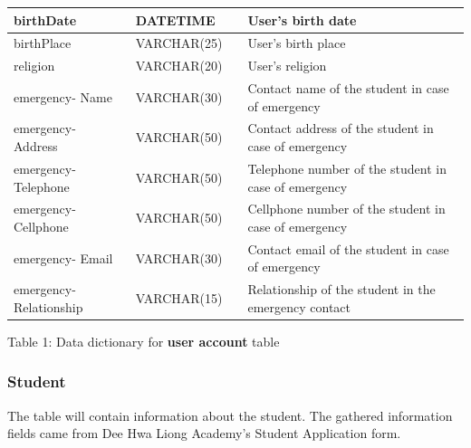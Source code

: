 \documentclass[11pt,a4paper,titlepage]{article}
\begin{document}
\begin{longtable}{ |p{2.5cm}|p{4.5cm}|p{2.5cm}|p{3cm}|  }
    birthDate & DATETIME & & User's birth date \\ \hline
    birthPlace & VARCHAR(25) & & User's birth place \\ \hline
    religion & VARCHAR(20) & & User's religion \\ \hline
    emergency- Name & VARCHAR(30) & & Contact name of the student in case of emergency \\ \hline
    emergency- Address & VARCHAR(50) & & Contact address of the student in case of emergency \\ \hline
    emergency- Telephone & VARCHAR(50) & & Telephone number of the student in case of emergency \\ \hline
    emergency- Cellphone & VARCHAR(50) & & Cellphone number of the student in case of emergency \\ \hline
    emergency- Email & VARCHAR(30) & & Contact email of the student in case of emergency \\ \hline
    emergency- Relationship & VARCHAR(15) & & Relationship of the student in the emergency contact \\ \hline
\end{longtable}

\vspace{1cm}
\begin{center}
Table 1: Data dictionary for \textbf{user account} table
\end{center}
\subsubsection{Student}

The table will contain information about the student. The gathered information fields came from Dee Hwa Liong Academy's Student Application form.
\end{document}
